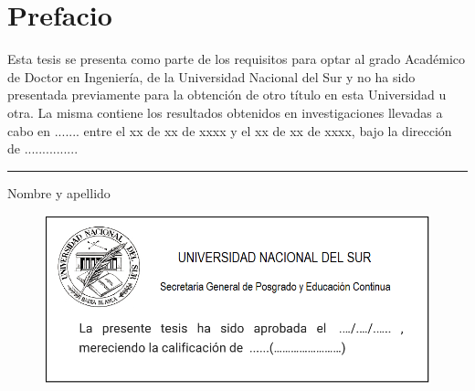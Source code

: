 \section*{Prefacio}

\noindent Esta tesis se presenta como parte de los requisitos para optar al grado Académico de Doctor en Ingeniería, de la Universidad Nacional del Sur y no ha sido presentada previamente para la obtención de otro título en esta Universidad u otra. La misma contiene los resultados obtenidos en investigaciones llevadas a cabo en ....... entre el xx de xx de xxxx y el xx de xx de xxxx, bajo la dirección de ...............

\vspace{2.0cm}

\rule{35mm}{0.1mm}

Nombre y apellido

\vspace{2.0cm}

\begin{figure}[!h]
	\centering
	\includegraphics[scale = .7]{img/Prefacio.png}
\end{figure}